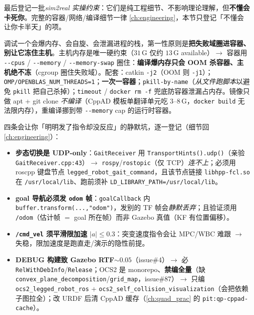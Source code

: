 最后登记一批\emph{sim2real 实操约束}：它们是纯工程细节、不影响理论理解，但\textbf{不懂会卡死你}。完整的容器/网络/编译细节一律 \cref{ch:engineering}，本节只登记「不懂会让你卡半天」的项。

\begin{insight}\label{ins:qadv-container}
调试一个会爆内存、会自旋、会泄漏进程的栈，第一性原则是\textbf{把失败域圈进容器、别让它冻住主机}。主机内存是唯一硬约束（$31$\,G 仅约 $13$\,G available）$\to$ 容器用 \texttt{-{}-cpus} / \texttt{-{}-memory} / \texttt{-{}-memory-swap} 圈住：\textbf{编译爆内存只会 OOM 杀容器、主机绝不冻}（cgroup 圈住失败域）。配套：catkin \texttt{-j2}（OOM 则 \texttt{-j1}）；\texttt{OMP/\allowbreak OPENBLAS\_NUM\_THREADS=1}；\textbf{一次一容器}；\texttt{pkill-by-name}（\emph{从文件跑脚本}以避免 \texttt{pkill} 把自己杀掉）；\texttt{timeout} / \texttt{docker rm -f} 兜底防容器泄漏占内存。镜像只做 apt + git clone \emph{不编译}（CppAD 模板单翻译单元吃 $3$–$8$\,G，\texttt{docker build} 无法限内存），重编译挪到带 \texttt{-{}-memory} cap 的运行时容器。
\end{insight}

\begin{note}\label{note:qadv-silent}
四条会让你「明明发了指令却没反应」的静默坑，逐一登记（细节回 \cref{ch:engineering}）：
\begin{itemize}
  \item \textbf{步态切换是 UDP-only}：\texttt{GaitReceiver} 用 \texttt{TransportHints().\allowbreak udp()}（亲验 \texttt{GaitReceiver.\allowbreak cpp:43}）$\to$ \texttt{rospy}/\allowbreak\texttt{rostopic}（仅 TCP）\emph{连不上}；必须用 roscpp 键盘节点 \texttt{legged\_robot\_gait\_command}，且该节点链接 \texttt{libhpp-fcl.\allowbreak so} 在 \texttt{/\allowbreak usr/\allowbreak local/\allowbreak lib}、跑前须补 \texttt{LD\_LIBRARY\_PATH=/\allowbreak usr/\allowbreak local/\allowbreak lib}。
  \item \textbf{goal 导航必须发 \texttt{odom} 帧}：\texttt{goalCallback} 内 \texttt{buffer.\allowbreak transform(...,"odom")}，发别的 TF 帧会\emph{静默丢弃}；且验证须用 \texttt{/odom}（估计帧 $=$ goal 所在帧）而非 Gazebo 真值（KF 有位置偏移）。
  \item \textbf{\texttt{/cmd\_vel} 须平滑限加速 $|a|\le0.3$}：突变速度指令会让 MPC/WBC 难跟 $\to$ 失稳，限加速度是跑直走/演示的隐性前提。
  \item \textbf{DEBUG 构建致 Gazebo RTF$\sim0.05$}（issue\#4）$\to$ 必 \texttt{RelWithDebInfo}/\allowbreak\texttt{Release}；OCS2 是 monorepo、\textbf{禁编全量}（缺 \texttt{convex\_plane\_decomposition}/\allowbreak\texttt{grid\_map}，issue\#87）$\to$ 只编 \texttt{ocs2\_legged\_robot\_ros} + \texttt{ocs2\_self\_collision\_visualization}（会把依赖子图拉全）；改 URDF 后清 CppAD 缓存（\cref{ch:quad_prac} 的 \texttt{pit:qp-cppad-cache}）。
\end{itemize}
\end{note}

